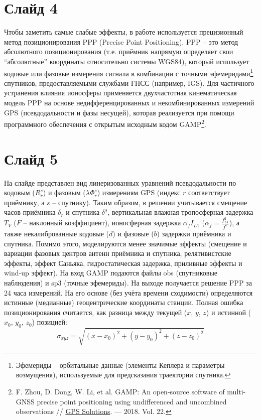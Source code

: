 \documentclass[a4paper,14pt]{extarticle}
\begin{document}
\section*{Слайд 4}
Чтобы заметить самые слабые эффекты, в работе используется прецизионный метод позиционирования PPP (Precise Point Positioning).
PPP -- это метод абсолютного позиционирования (т.е. приёмник напрямую определяет свои ``абсолютные'' координаты относительно системы WGS84), который использует кодовые или фазовые измерения сигнала в комбинации с точными эфемеридами\footnote{Эфемериды -- орбитальные данные (элементы Кеплера и параметры возмущения), используемые для предсказания траектории спутника.} спутников, предоставляемыми службами ГНСС (например, IGS).
Для частичного устранения влияния ионосферы применяется двухчастотная кинематическая модель PPP на основе недифференцированных и некомбинированных измерений GPS (псевдодальности и фазы несущей), которая реализуется при помощи программного обеспечения с открытым исходным кодом GAMP\footnote{F. Zhou, D. Dong, W. Li, et al. GAMP: An open-source software of multi-GNSS precise point positioning using undifferenced and uncombined observations // \href{http://dx.doi.org/10.1007/s10291-018-0699-9}{GPS Solutions}. --- 2018. Vol. 22.}.

\section*{Слайд 5}
На слайде представлен вид линеризованных уравнений псевдодальности по кодовым ($R_r^s$) и фазовым ($\lambda \Phi_r^s$) измерениям GPS (индекс $r$ соответствует приёмнику, а $s$ -- спутнику). 
Таким образом, в решении учитывается смещение часов приёмника $\delta_r$ и спутника $\delta^s$, вертикальная влажная тропосферная задержка $T_V$ ($F$ -- наклонный коэффициент), ионосферная задержка $\alpha_fI_{L1}$ ($\alpha_f=\frac{f_{L1}^2}{f^2}$), а также некалиброванные кодовые ($d$) и фазовые ($b$) задержки приёмника и спутника.
Помимо этого, моделируются менее значимые эффекты (смещение и вариации фазовых центров антенн приёмника и спутника, релятивистские эффекты, эффект Саньяка, гидростатическая задержка, приливные эффекты и wind-up эффект).
На вход GAMP подаются файлы obs (спутниковые наблюдения) и sp3 (точные эфемериды).
На выходе получается решение PPP за 24 часа измерений.
На его основе (без учёта времени сходимости) определяются истинные (медианные) геоцентрические координаты станции.
Полная ошибка позиционирования считается, как разница между текущей ($x$, $y$, $z$) и истинной ($x_0$, $y_0$, $z_0$) позицией:
\begin{equation*}
\sigma_{xyz}=\sqrt{(x-x_0)^2+(y-y_0)^2+(z-z_0)^2}    
\end{equation*}  
\end{document}
